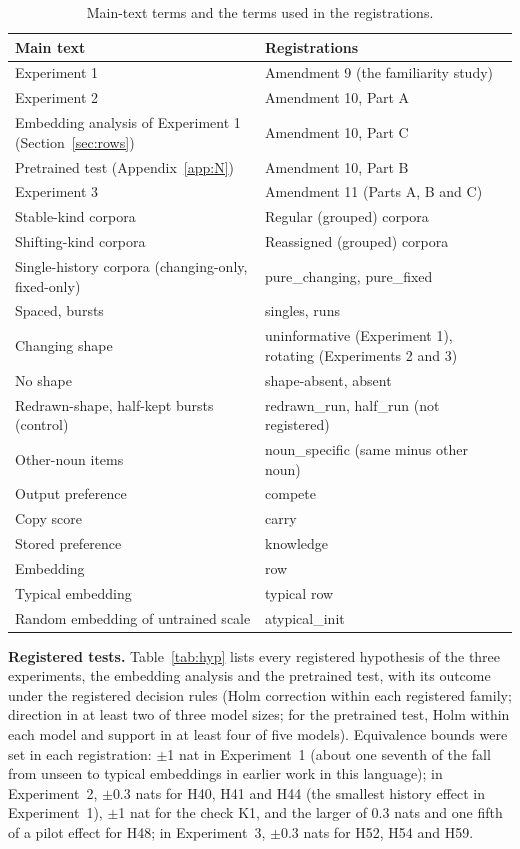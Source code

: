 \begin{table}[!htbp]
\centering\small

\begin{tabular}{@{}ll@{}}
\toprule
Main text & Registrations \\
\midrule
Experiment 1 & Amendment 9 (the familiarity study) \\
Experiment 2 & Amendment 10, Part A \\
Embedding analysis of Experiment 1 (Section~\ref{sec:rows}) & Amendment 10, Part C \\
Pretrained test (Appendix~\ref{app:N}) & Amendment 10, Part B \\
Experiment 3 & Amendment 11 (Parts A, B and C) \\
Stable-kind corpora & Regular (grouped) corpora \\
Shifting-kind corpora & Reassigned (grouped) corpora \\
Single-history corpora (changing-only, fixed-only) & pure\_changing, pure\_fixed \\
Spaced, bursts & singles, runs \\
Changing shape & uninformative (Experiment 1), rotating (Experiments 2 and 3) \\
No shape & shape-absent, absent \\
Redrawn-shape, half-kept bursts (control) & redrawn\_run, half\_run (not registered) \\
Other-noun items & noun\_specific (same minus other noun) \\
Output preference & compete \\
Copy score & carry \\
Stored preference & knowledge \\
Embedding & row \\
Typical embedding & typical row \\
Random embedding of untrained scale & atypical\_init \\
\bottomrule
\end{tabular}
\caption{Main-text terms and the terms used in the registrations.}
\label{tab:terms}
\end{table}

\textbf{Registered tests.} Table~\ref{tab:hyp} lists every registered hypothesis of the three experiments, the embedding analysis and the pretrained test, with its outcome under the registered decision rules (Holm correction within each registered family; direction in at least two of three model sizes; for the pretrained test, Holm within each model and support in at least four of five models). Equivalence bounds were set in each registration: $\pm$1 nat in Experiment~1 (about one seventh of the fall from unseen to typical embeddings in earlier work in this language); in Experiment~2, $\pm$0.3 nats for H40, H41 and H44 (the smallest history effect in Experiment~1), $\pm$1 nat for the check K1, and the larger of 0.3 nats and one fifth of a pilot effect for H48; in Experiment~3, $\pm$0.3 nats for H52, H54 and H59.

